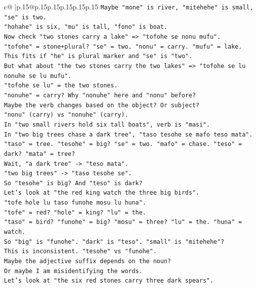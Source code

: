 \documentclass{article}
\begin{document}
{\begin{supertabular}{c@{$\;$}|p{.15\linewidth}@{}p{.15\linewidth}p{.15\linewidth}p{.15\linewidth}p{.15\linewidth}p{.15\linewidth}}
{{{\texttt{Maybe "mone" is river, "mitehehe" is small, "se" is two.} \\
\texttt{"hohahe" is six, "mu" is tall, "fono" is boat.} \\
\texttt{Now check "two stones carry a lake" => "tofohe se nonu mufu".} \\
\texttt{"tofohe" = stone+plural? "se" = two. "nonu" = carry. "mufu" = lake.} \\
\texttt{This fits if "he" is plural marker and "se" is "two".} \\
\texttt{But what about "the two stones carry the two lakes" => "tofohe se lu nonuhe se lu mufu".} \\
\texttt{"tofohe se lu" = the two stones.} \\
\texttt{"nonuhe" = carry? Why "nonuhe" here and "nonu" before?} \\
\texttt{Maybe the verb changes based on the object? Or subject?} \\
\texttt{"nonu" (carry) vs "nonuhe" (carry).} \\
\texttt{In "two small rivers hold six tall boats", verb is "masi".} \\
\texttt{In "two big trees chase a dark tree", "taso tesohe se mafo teso mata".} \\
\texttt{"taso" = tree. "tesohe" = big? "se" = two. "mafo" = chase. "teso" = dark? "mata" = tree?} \\
\texttt{Wait, "a dark tree" {-}> "teso mata".} \\
\texttt{"two big trees" {-}> "taso tesohe se".} \\
\texttt{So "tesohe" is big? And "teso" is dark?} \\
\texttt{Let's look at "the red king watch the three big birds".} \\
\texttt{"tofe hole lu taso funohe mosu lu huna".} \\
\texttt{"tofe" = red? "hole" = king? "lu" = the.} \\
\texttt{"taso" = bird? "funohe" = big? "mosu" = three? "lu" = the. "huna" = watch.} \\
\texttt{So "big" is "funohe". "dark" is "teso". "small" is "mitehehe"?} \\
\texttt{This is inconsistent. "tesohe" vs "funohe".} \\
\texttt{Maybe the adjective suffix depends on the noun?} \\
\texttt{Or maybe I am misidentifying the words.} \\
\texttt{Let's look at "the six red stones carry three dark spears".} \\
}}}
\end{supertabular}}
\end{document}
